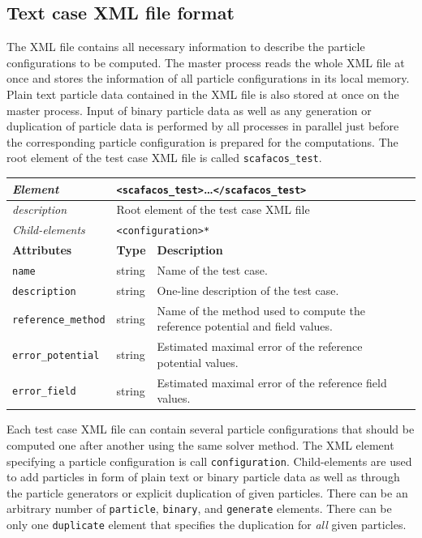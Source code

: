 \subsection*{Text case XML file format}

\noindent
The XML file contains all necessary information to describe the particle configurations to be computed.
The master process reads the whole XML file at once and stores the information of all particle configurations in its local memory.
Plain text particle data contained in the XML file is also stored at once on the master process.
Input of binary particle data as well as any generation or duplication of particle data is performed by all processes in parallel just before the corresponding particle configuration is prepared for the computations.
The root element of the test case XML file is called \texttt{scafacos\_test}.

\begin{center}
\small
\begin{tabular}{|p{3cm}|p{1.5cm}|p{8.5cm}|}
  \hline
  \textit{Element}           & \multicolumn{2}{p{10cm}|}{\texttt{<scafacos\_test>}\dots\texttt{</scafacos\_test>}} \\ \hline
  \textit{description}       & \multicolumn{2}{p{10cm}|}{Root element of the test case XML file} \\ \hline
  \textit{Child-elements}    & \multicolumn{2}{p{10cm}|}{\texttt{<configuration>*}} \\ \hline
  \hline
  \textbf{Attributes}        & \textbf{Type} & \textbf{Description} \\ \hline
  \texttt{name}              & string & Name of the test case. \\ \hline
  \texttt{description}       & string & One-line description of the test case. \\ \hline
  \texttt{reference\_method} & string & Name of the method used to compute the reference potential and field values. \\ \hline
  \texttt{error\_potential}  & string & Estimated maximal error of the reference potential values. \\ \hline
  \texttt{error\_field}      & string & Estimated maximal error of the reference field values. \\ \hline
\end{tabular}
\end{center}

\noindent
Each test case XML file can contain several particle configurations that should be computed one after another using the same solver method.
The XML element specifying a particle configuration is call \texttt{configuration}.
Child-elements are used to add particles in form of plain text or binary particle data as well as through the particle generators or explicit duplication of given particles.
There can be an arbitrary number of \texttt{particle}, \texttt{binary}, and \texttt{generate} elements.
There can be only one \texttt{duplicate} element that specifies the duplication for \emph{all} given particles.

